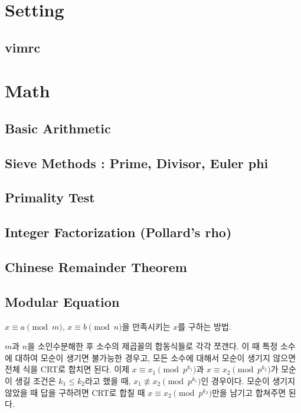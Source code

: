 \documentclass[10pt,landscape,a4paper,twocolumn]{article}
\begin{document}
\tableofcontents


\section{Setting}

\subsection{vimrc}



\section{Math}

\subsection{Basic Arithmetic}


\subsection{Sieve Methods : Prime, Divisor, Euler phi}


\subsection{Primality Test}


\subsection{Integer Factorization (Pollard's rho)}


\subsection{Chinese Remainder Theorem}


\subsection{Modular Equation}

$x \equiv a \pmod{m}$, $x \equiv b \pmod{n}$을 만족시키는 $x$를 구하는 방법.

$m$과 $n$을 소인수분해한 후 소수의 제곱꼴의 합동식들로 각각 쪼갠다.
이 때 특정 소수에 대하여 모순이 생기면 불가능한 경우고,
모든 소수에 대해서 모순이 생기지 않으면 전체 식을 CRT로 합치면 된다. 이제
$x \equiv x_1 \pmod{p^{k_1}}$과 $x \equiv x_2 \pmod{p^{k_2}}$가
모순이 생길 조건은 $k_1 \leq k_2$라고 했을 때,
$x_1 \not\equiv x_2 \pmod{p^{k_1}}$인 경우이다.
모순이 생기지 않았을 때 답을 구하려면 
CRT로 합칠 때 $x \equiv x_2 \pmod{p^{k_2}}$만을 남기고 합쳐주면 된다.
\end{document}
